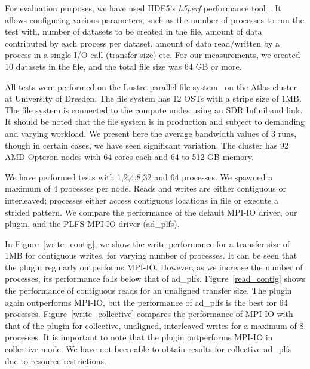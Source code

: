 For evaluation purposes, we have used HDF5's \textit{h5perf} performance tool~\cite{h5perf}. It allows configuring various parameters, such as the number of processes to run the test with, number of datasets to be created in the file, amount of data contributed by each process per dataset, amount of data read/written by a process in a single I/O call (transfer size) etc. For our measurements, we created 10 datasets in the file, and the total file size was 64 GB or more.

All tests were performed on the Lustre parallel file system~\cite{lustre} on the Atlas cluster at University of Dresden. The file system has 12 OSTs with a stripe size of 1MB. The file system is connected to the compute nodes using an SDR Infiniband link. It should be noted that the file system is in production and subject to demanding and varying workload. We present here the average bandwidth values of 3 runs, though in certain cases, we have seen significant variation.
The cluster has 92 AMD Opteron nodes with 64 cores each and 64 to 512 GB memory. 

We have performed tests with 1,2,4,8,32 and 64 processes. We spawned a maximum of 4 processes per node.
Reads and writes are either contiguous or interleaved; processes either access contiguous locations in file or execute a strided pattern.
We compare the performance of the default MPI-IO driver, our plugin, and the PLFS MPI-IO driver (ad\_plfs). 

In Figure~\ref{write_contig}, we show the write performance for a transfer size of 1MB for contiguous writes, for varying number of processes. It can be seen that the plugin regularly outperforms MPI-IO. However, as we increase the number of processes, its performance falls below that of ad\_plfs. Figure~\ref{read_contig} shows the performance of contiguous reads for an unaligned transfer size. The plugin again outperforms MPI-IO, but the performance of ad\_plfs is the best for 64 processes. 
Figure~\ref{write_collective} compares the performance of MPI-IO with that of the plugin for collective, unaligned, interleaved writes for a maximum of 8 processes. It is important to note that the plugin outperforms MPI-IO in collective mode. We have not been able to obtain results for collective ad\_plfs due to resource restrictions.   

